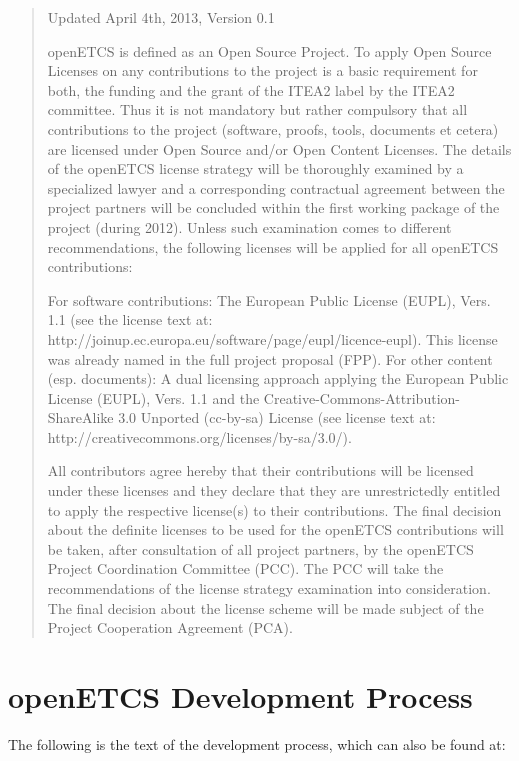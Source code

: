 \documentclass{template/openetcs_report}
\begin{document}
\begin{quote}
Updated April 4th, 2013, Version 0.1

openETCS is defined as an Open Source Project. To apply Open Source Licenses on any contributions to the project is a basic requirement for both, the funding and the grant of the ITEA2 label by the ITEA2 committee. Thus it is not mandatory but rather compulsory that all contributions to the project (software, proofs, tools, documents et cetera) are licensed under Open Source and/or Open Content Licenses. The details of the openETCS license strategy will be thoroughly examined by a specialized lawyer and a corresponding contractual agreement between the project partners will be concluded within the first working package of the project (during 2012). Unless such examination comes to different recommendations, the following licenses will be applied for all openETCS contributions:

For software contributions: The European Public License (EUPL), Vers. 1.1 (see the license text at: http://joinup.ec.europa.eu/software/page/eupl/licence-eupl). This license was already named in the full project proposal (FPP). For other content (esp. documents): A dual licensing approach applying the European Public License (EUPL), Vers. 1.1 and the Creative-Commons-Attribution-ShareAlike 3.0 Unported (cc-by-sa) License (see license text at: http://creativecommons.org/licenses/by-sa/3.0/).

All contributors agree hereby that their contributions will be licensed under these licenses and they declare that they are unrestrictedly entitled to apply the respective license(s) to their contributions. The final decision about the definite licenses to be used for the openETCS contributions will be taken, after consultation of all project partners, by the openETCS Project Coordination Committee (PCC). The PCC will take the recommendations of the license strategy examination into consideration. The final decision about the license scheme will be made subject of the Project Cooperation Agreement (PCA).

\end{quote}

\chapter{openETCS Development Process}
\label{sec:dev-process}

The following is the text of the development process, which can also be found at:
\end{document}
